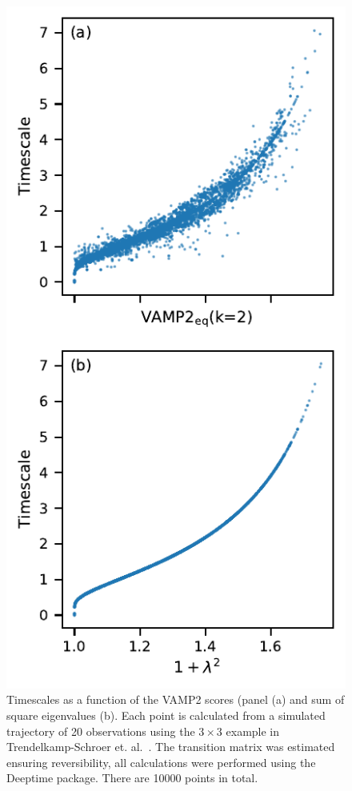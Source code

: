 \documentclass[journal=jacsat,manuscript=article]{achemso}
\begin{document}
\begin{figure}
    \centering
    \includegraphics{figures/timescale_vs_vamp_vs_evs.pdf}
    \caption{Timescales as a function of the VAMP2 scores (panel (a) and sum of square eigenvalues (b). Each point is calculated from a simulated trajectory of 20 observations using the $3\times 3$ example in Trendelkamp-Schroer et. al.~\cite{trendelkamp-schroerEstimationUncertaintyReversible2015b}. The transition matrix was estimated ensuring reversibility, all calculations were performed using the Deeptime package. There are 10000 points in total.}
    \label{fig:bad_vamps_examples}
\end{figure}
\end{document}
